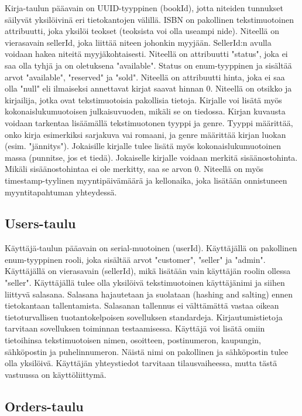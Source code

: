 \documentclass[11pt,a4paper]{article}
\begin{document}
Kirja-taulun pääavain on UUID-tyyppinen (bookId), jotta niteiden tunnukset säilyvät yksilöivinä eri tietokantojen välillä. ISBN on pakollinen tekstimuotoinen attribuutti, joka yksilöi teokset (teoksista voi olla useampi nide). Niteellä on vierasavain sellerId, joka liittää niteen johonkin myyjään. SellerId:n avulla voidaan hakea niteitä myyjäkohtaisesti. Niteellä on attribuutti "status", joka ei saa olla tyhjä ja on oletuksena "available". Status on enum-tyyppinen ja sisältää arvot "available", "reserved" ja "sold". Niteellä on attribuutti hinta, joka ei saa olla "null" eli ilmaiseksi annettavat kirjat saavat hinnan 0. Niteellä on otsikko ja kirjailija, jotka ovat tekstimuotoisia pakollisia tietoja. Kirjalle voi lisätä myös kokonaislukumuotoisen julkaisuvuoden, mikäli se on tiedossa. Kirjan kuvausta voidaan tarkentaa lisäämällä tekstimuotonen tyyppi ja genre. Tyyppi määrittää, onko kirja esimerkiksi sarjakuva vai romaani, ja genre määrittää kirjan luokan (esim. "jännitys"). Jokaisille kirjalle tulee lisätä myös kokonaislukumuotoinen massa (punnitse, jos et tiedä). Jokaiselle kirjalle voidaan merkitä sisäänostohinta. Mikäli sisäänostohintaa ei ole merkitty, saa se arvon 0. Niteellä on myös timestamp-tyylinen myyntipäivämäärä ja kellonaika, joka lisätään onnistuneen myyntitapahtuman yhteydessä.

\subsection{Users-taulu}

Käyttäjä-taulun pääavain on serial-muotoinen (userId). Käyttäjällä on pakollinen enum-tyyppinen rooli, joka sisältää arvot "customer", "seller" ja "admin". Käyttäjällä on vierasavain (sellerId), mikä lisätään vain käyttäjän roolin ollessa "seller". Käyttäjällä tulee olla yksilöivä tekstimuotoinen käyttäjänimi ja siihen liittyvä salasana. Salasana hajautetaan ja suolataan (hashing and salting) ennen tietokantaan tallentamista. Salasanan tallennus ei välttämättä vastaa oikean tietoturvallisen tuotantokelpoisen sovelluksen standardeja. Kirjautumistietoja tarvitaan sovelluksen toiminnan testaamisessa. Käyttäjä voi lisätä omiin tietoihinsa tekstimuotoisen nimen, osoitteen, postinumeron, kaupungin, sähköpostin ja puhelinnumeron. Näistä nimi on pakollinen ja sähköpostin tulee olla yksilöivä. Käyttäjän yhteystiedot tarvitaan tilausvaiheessa, mutta tästä vastuussa on käyttöliittymä.

\subsection{Orders-taulu}
\end{document}
